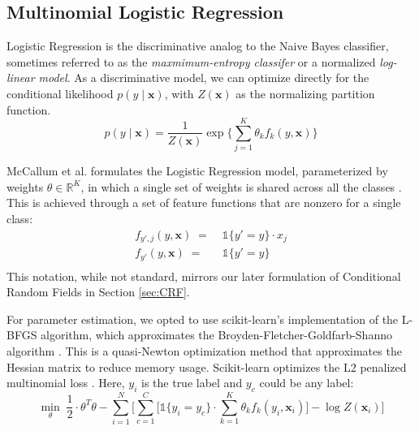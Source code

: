 \documentclass{article}
\begin{document}
\subsection{Multinomial Logistic Regression}
\label{sec:LR}
Logistic Regression is the discriminative analog to the Naive Bayes
classifier, sometimes referred to as the \textit{maxmimum-entropy classifer}
or a normalized \textit{log-linear model}. As a discriminative model,
we can optimize directly for the conditional likelihood $p(y \mid \mathbf{x})$,
with $Z(\mathbf{x})$ as the normalizing partition function.
\begin{equation}
  p(y \mid \mathbf{x}) = \frac{1}{Z(\mathbf{x})} \exp \Bigg\{ \sum_{j=1}^K \theta_k f_k\left( y, \mathbf{x} \right) \Bigg\}
\end{equation}

McCallum et al. formulates the Logistic Regression model, parameterized by
weights $\theta \in \mathbb{R}^K$, in which a single set of weights is shared
across all the classes \cite{McCallumCRF}. This is achieved through a set of
feature functions that are nonzero for a single class:
\begin{equation}
  \begin{aligned}
    f_{y', j} \left( y, \mathbf{x} \right) \; = \; & \mathds{1} \{ y' = y \} \cdot x_j \\
    f_{y'} \left(y, \mathbf{x}\right) \; = \; & \mathds{1} \{ y' = y \} \\
  \end{aligned}
\end{equation}
This notation, while not standard, mirrors our later formulation of Conditional
Random Fields in Section \ref{sec:CRF}.

For parameter estimation, we opted to use scikit-learn's implementation
of the L-BFGS algorithm, which approximates the Broyden-Fletcher-Goldfarb-Shanno
algorithm \cite{scikit-learn}. This is a quasi-Newton optimization method that approximates the
Hessian matrix to reduce memory usage. Scikit-learn optimizes the L2 penalized
multinomial loss \cite{scikit-learn} \cite{murphy}. Here, $y_i$ is the true
label and $y_c$ could be any label:
\begin{equation}
  \min_{\theta} \; \frac{1}{2} \cdot \theta^T \theta - \sum_{i=1}^N \Bigg[ \sum_{c=1}^C \Bigg[ \mathds{1} \{ y_i = y_c \} \cdot \sum_{k=1}^K \theta_k f_k\left( y_i, \mathbf{x}_i \right) \Bigg] - \log Z(\mathbf{x}_i)  \Bigg]
\end{equation}
\end{document}
